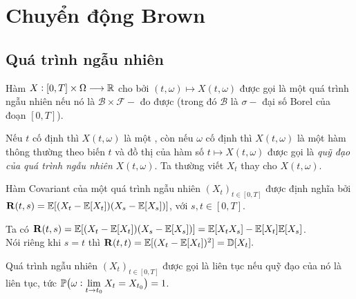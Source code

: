 \chapter{Chuyển động Brown}
\section{Quá trình ngẫu nhiên}
\begin{defn}
    Hàm $X: [0, T] \times \Omega \longrightarrow \mathbb{R}$ cho bởi $ (t, \omega) \longmapsto X(t, \omega)$ được gọi là một quá trình ngẫu nhiên nếu nó là $\mathcal{B} \times \mathcal{F}-$ đo được (trong đó $\mathcal{B}$ là $\sigma-$ đại số Borel của đoạn $[0, T]$).
\end{defn}
\begin{remark*}
Nếu $t$ cố định thì $X(t,\omega)$ là một \bnn, còn nếu $\omega$ cố định thì $X(t, \omega)$ là một hàm thông thường theo biến $t$ và đồ thị của hàm số $t\longmapsto X(t, \omega)$ được gọi là \textit{quỹ đạo của quá trình ngẫu nhiên} $X(t, \omega)$. Ta thường viết $X_t$ thay cho $X(t, \omega)$.
\end{remark*}
\begin{defn}
    Hàm Covariant của một quá trình ngẫu nhiên $(X_t)_{t \in [0, T]}$ được định nghĩa bởi  $\mathbf{R}(t,s) = \mathbb{E}[(X_t - \mathbb{E}[X_t])(X_s - \mathbb{E}[X_s])]$, với $s,t \in [0, T]$.
\end{defn}
Ta có $\mathbf{R}(t,s) = \mathbb{E}[(X_t - \mathbb{E}[X_t])(X_s - \mathbb{E}[X_s])] = \mathbb{E}[X_tX_s]-\mathbb{E}[X_t]\mathbb{E}[X_s]$.\\
Nói riêng khi $s=t$ thì $\mathbf{R}(t,t) = \mathbb{E}[(X_t - \mathbb{E}[X_t])^2] = \mathbb{D}[X_t].$

\begin{defn}
    Quá trình ngẫu nhiên $(X_t)_{t \in [0, T]}$ được gọi là liên tục nếu quỹ đạo của nó là liên tục, tức $\mathbb{P}\big(\omega: \lim\limits_{t \rightarrow t_0} X_t = X_{t_0}\big)= 1$.
\end{defn}
